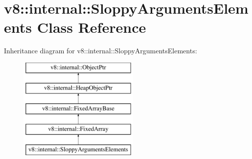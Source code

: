 \hypertarget{classv8_1_1internal_1_1SloppyArgumentsElements}{}\section{v8\+:\+:internal\+:\+:Sloppy\+Arguments\+Elements Class Reference}
\label{classv8_1_1internal_1_1SloppyArgumentsElements}
Inheritance diagram for v8\+:\+:internal\+:\+:Sloppy\+Arguments\+Elements\+:\begin{figure}[H]
\begin{center}
\leavevmode
\includegraphics[height=5.000000cm]{classv8_1_1internal_1_1SloppyArgumentsElements}
\end{center}
\end{figure}
